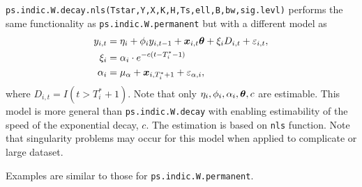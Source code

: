 \documentclass[12pt]{article}
\begin{document}
 \texttt{ps.indic.W.decay.nls(Tstar,Y,X,K,H,Ts,ell,B,bw,sig.levl)} performs the same functionality as  \texttt{ps.indic.W.permanent} but with a different model as 
 \begin{align*}
 	y_{i,t} &= \eta_i + \phi_i y_{i, t-1}  + \boldsymbol{x}_{i, t}\boldsymbol{\theta} + \xi_i D_{i,t} + \varepsilon_{i,t},\\
 	\xi_i &= \alpha_i \cdot e^{-c(t-T_i^*-1)} \\
 	\alpha_i & = \mu_{\alpha} + \boldsymbol{x}_{i, T_i^*+1} + \varepsilon_{\alpha, i},
 \end{align*}
 where $D_{i,t}=I(t > T_i^*+1)$. Note that only $\eta_i, \phi_i, \alpha_i, \boldsymbol{\theta},c$ are estimable. This model  is more general than \texttt{ps.indic.W.decay} with enabling estimability of the speed of the exponential decay, $c$. The estimation is based on \texttt{nls} function. Note that singularity problems may occur for this model when applied to complicate or large dataset.
 
 Examples are similar to those for \texttt{ps.indic.W.permanent}.


\end{document}
